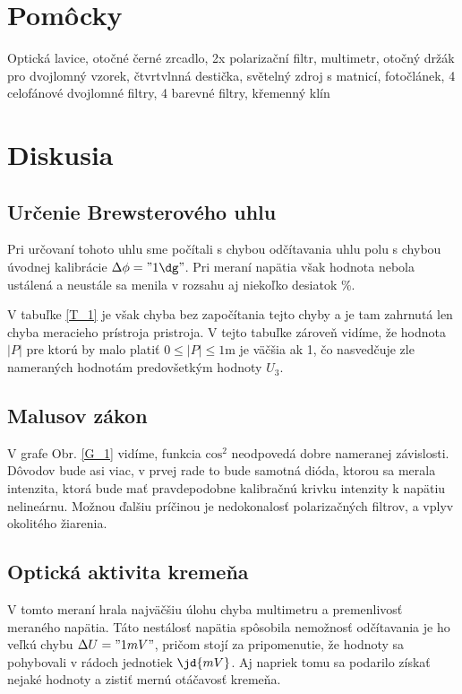 \documentclass[10pt]{scrartcl}
\begin{document}
\MakeFJFIHead{}






\section{Pomôcky}
Optická lavice, otočné černé zrcadlo, 2x polarizační filtr, multimetr, otočný držák
pro dvojlomný vzorek, čtvrtvlnná destička, světelný zdroj s matnicí, fotočlánek, 4 celofánové
dvojlomné filtry, 4 barevné filtry, křemenný klín




\section{Diskusia}

\subsection{Určenie Brewsterového uhlu}
Pri určovaní tohoto uhlu sme počítali s chybou odčítavania uhlu polu s chybou úvodnej kalibrácie $\Delta \phi = "1 \dg" $. 
Pri meraní napätia však hodnota nebola ustálená a neustále sa menila v rozsahu aj niekoľko desiatok \%.

V tabuľke \ref{T_1} je však chyba bez započítania tejto chyby a je tam zahrnutá len chyba meracieho prístroja pristroja. 
V tejto tabuľke zároveň vidíme, že hodnota $|P|$ pre ktorú by malo platiť $0\leq|P|\leq1$m je väčšia ak 1, čo nasvedčuje zle nameraných hodnotám predovšetkým hodnoty $U_3$.

\subsection{Malusov zákon}
V grafe Obr. \ref{G_1} vidíme, funkcia $\mathrm{cos}^2$ neodpovedá dobre nameranej závislosti. Dôvodov bude asi viac, v prvej rade to bude samotná dióda, ktorou sa merala intenzita, ktorá bude mať pravdepodobne kalibračnú krivku intenzity k napätiu nelineárnu. Možnou ďalšiu príčinou je nedokonalosť polarizačných filtrov, a vplyv okolitého žiarenia.
\subsection{Optická aktivita kremeňa}

V tomto meraní hrala najväčšiu úlohu chyba multimetru a premenlivosť meraného napätia. Táto nestálosť napätia spôsobila nemožnosť odčítavania je ho veľkú chybu $\Delta U= "1 mV"$, pričom stojí za pripomenutie, že hodnoty sa pohybovali v rádoch jednotiek $\jd{mV}$. Aj napriek tomu sa podarilo získať nejaké hodnoty a zistiť mernú otáčavosť kremeňa.
\end{document}
